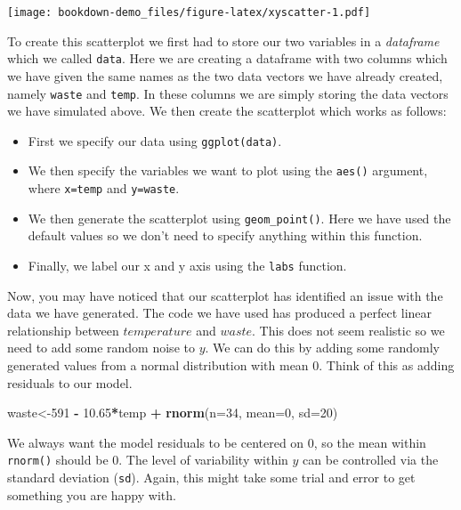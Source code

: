 \documentclass[
]{book}
\newenvironment{Shaded}{\begin{snugshade}}{\end{snugshade}}
\newcommand{\DataTypeTok}[1]{\textcolor[rgb]{0.13,0.29,0.53}{#1}}
\newcommand{\DecValTok}[1]{\textcolor[rgb]{0.00,0.00,0.81}{#1}}
\newcommand{\FloatTok}[1]{\textcolor[rgb]{0.00,0.00,0.81}{#1}}
\newcommand{\KeywordTok}[1]{\textcolor[rgb]{0.13,0.29,0.53}{\textbf{#1}}}
\newcommand{\NormalTok}[1]{#1}
\newcommand{\OperatorTok}[1]{\textcolor[rgb]{0.81,0.36,0.00}{\textbf{#1}}}
\newcommand{\StringTok}[1]{\textcolor[rgb]{0.31,0.60,0.02}{#1}}
\providecommand{\tightlist}{%
  \setlength{\itemsep}{0pt}\setlength{\parskip}{0pt}}
\begin{document}
\texttt{[image: bookdown-demo\_files/figure-latex/xyscatter-1.pdf]}

To create this scatterplot we first had to store our two variables in a \emph{dataframe} which we called \texttt{data}. Here we are creating a dataframe with two columns which we have given the same names as the two data vectors we have already created, namely \texttt{waste} and \texttt{temp}. In these columns we are simply storing the data vectors we have simulated above. We then create the scatterplot which works as follows:

\begin{itemize}
\tightlist
\item
  First we specify our data using \texttt{ggplot(data)}.
\item
  We then specify the variables we want to plot using the \texttt{aes()} argument, where \texttt{x=temp} and \texttt{y=waste}.
\item
  We then generate the scatterplot using \texttt{geom\_point()}. Here we have used the default values so we don't need to specify anything within this function.
\item
  Finally, we label our x and y axis using the \texttt{labs} function.
\end{itemize}

Now, you may have noticed that our scatterplot has identified an issue with the data we have generated. The code we have used has produced a perfect linear relationship between \(temperature\) and \(waste\). This does not seem realistic so we need to add some random noise to \(y\). We can do this by adding some randomly generated values from a normal distribution with mean 0. Think of this as adding residuals to our model.

\begin{Shaded}
\begin{Highlighting}[]
\NormalTok{waste<-}\DecValTok{591} \OperatorTok{-}\StringTok{ }\FloatTok{10.65}\OperatorTok{*}\NormalTok{temp }\OperatorTok{+}\StringTok{ }\KeywordTok{rnorm}\NormalTok{(}\DataTypeTok{n=}\DecValTok{34}\NormalTok{, }\DataTypeTok{mean=}\DecValTok{0}\NormalTok{, }\DataTypeTok{sd=}\DecValTok{20}\NormalTok{)}
\end{Highlighting}
\end{Shaded}

We always want the model residuals to be centered on 0, so the mean within \texttt{rnorm()} should be 0. The level of variability within \(y\) can be controlled via the standard deviation (\texttt{sd}). Again, this might take some trial and error to get something you are happy with.
\end{document}
